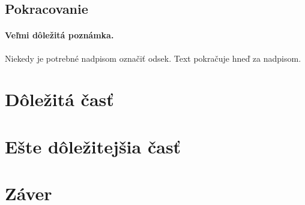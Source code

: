 \documentclass[10pt,twoside,slovak,a4paper]{article}
\begin{document}
\subsection{Pokracovanie} \label{Pre zdravie}

\paragraph{Veľmi dôležitá poznámka.}
Niekedy je potrebné nadpisom označiť odsek. Text pokračuje hneď za nadpisom.



\section{Dôležitá časť} \label{dolezita}




\section{Ešte dôležitejšia časť} \label{dolezitejsia}




\section{Záver} \label{zaver} %






\end{document}

